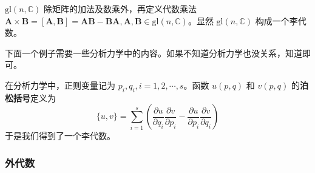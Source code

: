 \begin{example}{}
$\mathrm{gl}(n, \mathbb C)$ 除矩阵的加法及数乘外，再定义代数乘法 $\mathbf A\times \mathbf B=[\mathbf A, \mathbf B] = \mathbf A \mathbf B - \mathbf B\mathbf A, \mathbf A, \mathbf B\in \mathrm{gl}(n, \mathbb C)$。显然 $\mathrm{gl}(n,\mathbb C)$ 构成一个李代数。
\end{example}


下面一个例子需要一些分析力学中的内容。如果不知道分析力学也没关系，知道即可。
\begin{example}{}
在分析力学中，正则变量记为 $p_i,q_i, i=1,2,\cdots, s$。函数 $u(p,q)$ 和 $v(p, q)$ 的\textbf{泊松括号}定义为\begin{equation}
\{u, v\}=\sum_{i=1}^{s}\left(\frac{\partial u}{\partial q_{i}} \frac{\partial v}{\partial p_{i}}-\frac{\partial u}{\partial p_{i}} \frac{\partial v}{\partial q_{i}}\right)
\end{equation}
于是我们得到了一个李代数。




\end{example}

\subsubsection{外代数}

